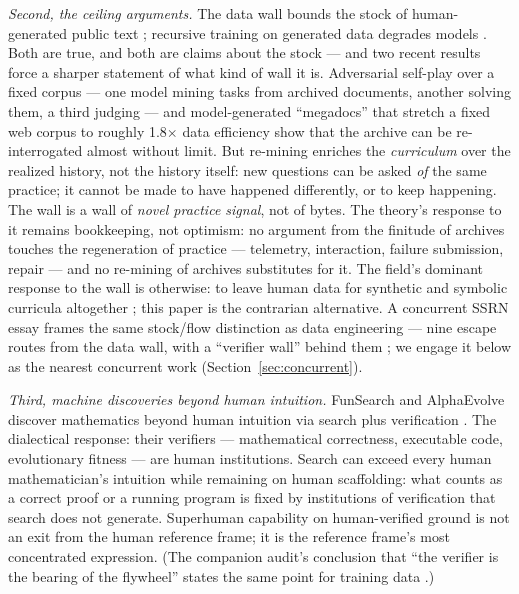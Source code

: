 \documentclass[10pt]{article}
\begin{document}
\emph{Second, the ceiling arguments.} The data wall bounds the stock of human-generated public text \cite{villalobos2022data}; recursive training on generated data degrades models \cite{shumailov2024collapse}. Both are true, and both are claims about the stock --- and two recent results force a sharper statement of what kind of wall it is. Adversarial self-play over a fixed corpus --- one model mining tasks from archived documents, another solving them, a third judging \cite{liu2025spice} --- and model-generated ``megadocs'' that stretch a fixed web corpus to roughly 1.8$\times$ data efficiency \cite{kim2026megadocs} show that the archive can be re-interrogated almost without limit. But re-mining enriches the \emph{curriculum} over the realized history, not the history itself: new questions can be asked \emph{of} the same practice; it cannot be made to have happened differently, or to keep happening. The wall is a wall of \emph{novel practice signal}, not of bytes. The theory's response to it remains bookkeeping, not optimism: no argument from the finitude of archives touches the regeneration of practice --- telemetry, interaction, failure submission, repair --- and no re-mining of archives substitutes for it. The field's dominant response to the wall is otherwise: to leave human data for synthetic and symbolic curricula altogether \cite{belova2026alternative}; this paper is the contrarian alternative. A concurrent SSRN essay frames the same stock/flow distinction as data engineering --- nine escape routes from the data wall, with a ``verifier wall'' behind them \cite{gharbi2026model}; we engage it below as the nearest concurrent work (Section~\ref{sec:concurrent}).

\emph{Third, machine discoveries beyond human intuition.} FunSearch and AlphaEvolve discover mathematics beyond human intuition via search plus verification \cite{romera2024mathematical, novikov2025alphaevolve}. The dialectical response: their verifiers --- mathematical correctness, executable code, evolutionary fitness --- are human institutions. Search can exceed every human mathematician's intuition while remaining on human scaffolding: what counts as a correct proof or a running program is fixed by institutions of verification that search does not generate. Superhuman capability on human-verified ground is not an exit from the human reference frame; it is the reference frame's most concentrated expression. (The companion audit's conclusion that ``the verifier is the bearing of the flywheel'' states the same point for training data \cite{yu2026failure}.)
\end{document}
